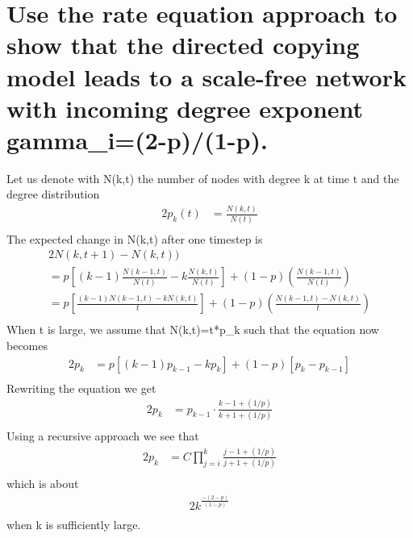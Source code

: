 \documentclass{article}%
\begin{document}
%
\normalsize%
\section{Use the rate equation approach to show that the directed copying model leads to a scale{-}free network with incoming degree exponent gamma\_i=(2{-}p)/(1{-}p).}%
\label{sec:Usetherateequationapproachtoshowthatthedirectedcopyingmodelleadstoascale{-}freenetworkwithincomingdegreeexponentgammai=(2{-}p)/(1{-}p).}%
Let us denote with N(k,t) the number of nodes with degree k at time t and the degree distribution%
\begin{alignat*}{2}%
p_k(t)&=\frac{N(k,t)}{N(t)}\\%
\end{alignat*}%
The expected change in N(k,t) after one timestep is%
\begin{alignat*}{2}%
N(k, t+1) - N(k, t))\\%
= p[(k-1)\frac{N(k-1,t)}{N(t)}-k\frac{N(k,t)}{N(t)}] + (1-p)(\frac{N(k-1,t)}{N(t)})\\%
= p[\frac{(k-1)N(k-1,t)-kN(k,t)}{t}] + (1-p)(\frac{N(k-1, t)-N(k,t)}{t})\\%
\end{alignat*}%
When t is large, we assume that N(k,t)=t*p\_k such that the equation now becomes%
\begin{alignat*}{2}%
p_k&=p[(k-1)p_{k-1}-kp_k] + (1-p)[p_k-p_{k-1}]\\%
\end{alignat*}%
Rewriting the equation we get%
\begin{alignat*}{2}%
p_k&=p_{k-1}\cdot\frac{k-1+(1/p)}{k+1+(1/p)}\\%
\end{alignat*}%
Using a recursive approach we see that%
\begin{alignat*}{2}%
p_k&=C\prod_{j=i}^{k}\frac{j-1+(1/p)}{j+1+(1/p)}\\%
\end{alignat*}%
which is about%
\begin{alignat*}{2}%
k^{\frac{-(2-p)}{(1-p)}}\\%
\end{alignat*}%
when k is sufficiently large.

%
\end{document}
